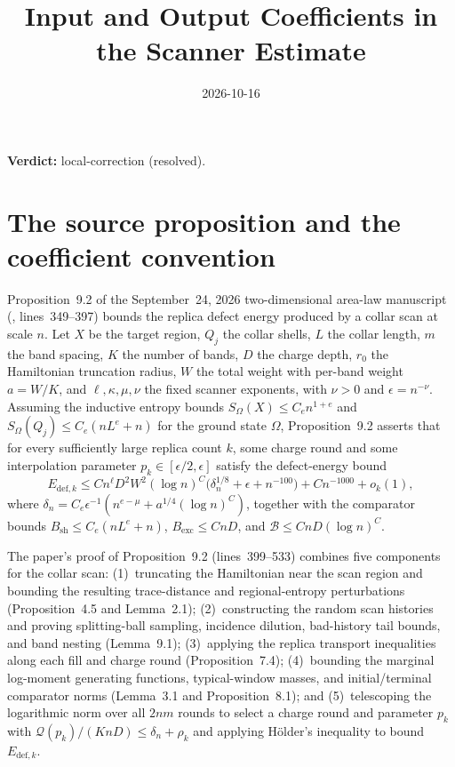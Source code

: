 \documentclass{article}
\title{Input and Output Coefficients in the Scanner Estimate}
\author{}
\date{2026-10-16}
\providecommand{\gapnote}[2]{\par\noindent\textbf{Verdict:} #1 (#2).\par}
\begin{document}
\maketitle
\gapnote{local-correction}{resolved}

\section{The source proposition and the coefficient convention}

Proposition~9.2 of the September~24, 2026 two-dimensional area-law
manuscript~\cite{OpenAI2026AreaLaw} (, lines~349--397)
bounds the replica defect energy produced by a collar scan at scale $n$. Let
$X$ be the target region, $Q_j$ the collar shells, $L$ the collar length, $m$
the band spacing, $K$ the number of bands, $D$ the charge depth, $r_0$ the
Hamiltonian truncation radius, $W$ the total weight with per-band weight
$a=W/K$, and $\ell,\kappa,\mu,\nu$ the fixed scanner exponents, with
$\nu>0$ and $\epsilon=n^{-\nu}$. Assuming the
inductive entropy bounds $S_\Omega(X)\le C_en^{1+e}$ and
$S_\Omega(Q_j)\le C_e(nL^e+n)$ for the ground state $\Omega$, Proposition~9.2
asserts that for every sufficiently large replica count $k$, some charge round
and some interpolation parameter
$p_k\in[\epsilon/2,\epsilon]$ satisfy the defect-energy bound
\[
    E_{\mathrm{def},k}\le Cn^\ell D^2W^2(\log n)^C
    \bigl(\delta_n^{1/8}+\epsilon+n^{-100}\bigr)+Cn^{-1000}+o_k(1),
\]
where $\delta_n=C_e\epsilon^{-1}(n^{e-\mu}+a^{1/4}(\log n)^C)$, together with
the comparator bounds $B_{\mathrm{sh}}\le C_e(nL^e+n)$,
$B_{\mathrm{exc}}\le CnD$, and $\mathcal B\le CnD(\log n)^C$.

The paper's proof of Proposition~9.2 (lines~399--533) combines five components
for the collar scan:
(1)~truncating the Hamiltonian near the scan region and bounding the resulting
trace-distance and regional-entropy perturbations (Proposition~4.5 and
Lemma~2.1);
(2)~constructing the random scan histories and proving splitting-ball sampling,
incidence dilution, bad-history tail bounds, and band nesting (Lemma~9.1);
(3)~applying the replica transport inequalities along each fill and charge
round (Proposition~7.4);
(4)~bounding the marginal log-moment generating functions, typical-window
masses, and initial/terminal comparator norms (Lemma~3.1 and
Proposition~8.1); and
(5)~telescoping the logarithmic norm over all $2nm$ rounds to select a charge
round and parameter $p_k$ with $\mathcal Q(p_k)/(KnD)\le\delta_n+\rho_k$ and
applying H\"older's inequality to bound $E_{\mathrm{def},k}$.
\end{document}
